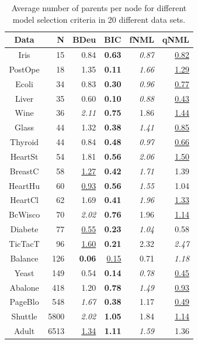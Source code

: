 \begin{table}
  \caption{Average number of parents per node 
    for different model selection criteria in 20 different data sets.}
\label{tbl:nofparams}
\begin{center}
\begin{tabular}{crrrrr}
    Data &     N &              BDeu &               BIC &           fNML &              qNML \\
\midrule
    Iris &    15 &              0.84 &     \textbf{0.63} &  \textit{0.87} &  \underline{0.82} \\
 PostOpe &    18 &              1.35 &     \textbf{0.11} &  \textit{1.66} &  \underline{1.29} \\
   Ecoli &    34 &              0.83 &     \textbf{0.30} &  \textit{0.96} &  \underline{0.77} \\
   Liver &    35 &              0.60 &     \textbf{0.10} &  \textit{0.88} &  \underline{0.43} \\
    Wine &    36 &     \textit{2.11} &     \textbf{0.75} &           1.86 &  \underline{1.44} \\
   Glass &    44 &              1.32 &     \textbf{0.38} &  \textit{1.41} &  \underline{0.85} \\
 Thyroid &    44 &              0.84 &     \textbf{0.48} &  \textit{0.97} &  \underline{0.66} \\
 HeartSt &    54 &              1.81 &     \textbf{0.56} &  \textit{2.06} &  \underline{1.50} \\
 BreastC &    58 &  \underline{1.27} &     \textbf{0.42} &  \textit{1.71} &              1.39 \\
 HeartHu &    60 &  \underline{0.93} &     \textbf{0.56} &  \textit{1.55} &              1.04 \\
 HeartCl &    62 &              1.69 &     \textbf{0.41} &  \textit{1.96} &  \underline{1.33} \\
 BcWisco &    70 &     \textit{2.02} &     \textbf{0.76} &           1.96 &  \underline{1.14} \\
 Diabete &    77 &  \underline{0.55} &     \textbf{0.23} &  \textit{1.04} &              0.58 \\
 TicTacT &    96 &  \underline{1.60} &     \textbf{0.21} &           2.32 &     \textit{2.47} \\
 Balance &   126 &     \textbf{0.06} &  \underline{0.15} &           0.71 &     \textit{1.18} \\
   Yeast &   149 &              0.54 &     \textbf{0.14} &  \textit{0.78} &  \underline{0.45} \\
 Abalone &   418 &              1.20 &     \textbf{0.78} &  \textit{1.49} &  \underline{0.93} \\
 PageBlo &   548 &     \textit{1.67} &     \textbf{0.38} &           1.17 &  \underline{0.49} \\
 Shuttle &  5800 &     \textit{2.02} &     \textbf{1.05} &           1.84 &  \underline{1.14} \\
   Adult &  6513 &  \underline{1.34} &     \textbf{1.11} &  \textit{1.59} &              1.36 \\
\end{tabular}
\end{center}
\end{table}
